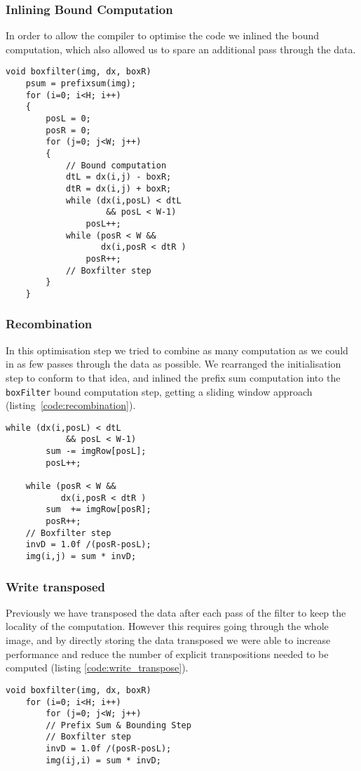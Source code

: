 \subsubsection{Inlining Bound Computation}

In order to allow the compiler to optimise the code we inlined the bound computation, which also allowed us to spare an additional pass through the data.

\begin{lstlisting}[caption=Inlining of the bound computation, label=code:inlining]
void boxfilter(img, dx, boxR) 
    psum = prefixsum(img);
    for (i=0; i<H; i++)
    {
        posL = 0;
        posR = 0;
        for (j=0; j<W; j++)
        {
            // Bound computation
            dtL = dx(i,j) - boxR;
            dtR = dx(i,j) + boxR;
            while (dx(i,posL) < dtL 
                    && posL < W-1)
                posL++;
            while (posR < W && 
                   dx(i,posR < dtR )
                posR++;
            // Boxfilter step
        }
    }
\end{lstlisting}

\subsubsection{Recombination}

In this optimisation step we tried to combine as many computation as we could in as few passes through the data as possible. We rearranged the initialisation step to conform to that idea, and inlined the prefix sum computation into the \lstinline{boxFilter} bound computation step, getting a sliding window approach (listing~\ref{code:recombination}).

\begin{lstlisting}[caption=Recombination, label=code:recombination]
    while (dx(i,posL) < dtL 
            && posL < W-1)
        sum -= imgRow[posL];
        posL++;

    while (posR < W && 
           dx(i,posR < dtR )
        sum  += imgRow[posR];
        posR++;
    // Boxfilter step
    invD = 1.0f /(posR-posL);
    img(i,j) = sum * invD;
\end{lstlisting}

\subsubsection{Write transposed}\label{sec:method:write_transposed}

Previously we have transposed the data after each pass of the filter to keep the locality of the computation. However this requires going through the whole image, and by directly storing the data transposed we were able to increase performance and reduce the number of explicit transpositions needed to be computed (listing \ref{code:write_transpose}). 
\begin{lstlisting}[caption=Write transpose, label=code:write_transpose]
void boxfilter(img, dx, boxR) 
    for (i=0; i<H; i++)
        for (j=0; j<W; j++)
        // Prefix Sum & Bounding Step
        // Boxfilter step
        invD = 1.0f /(posR-posL);
        img(ij,i) = sum * invD;
\end{lstlisting}

